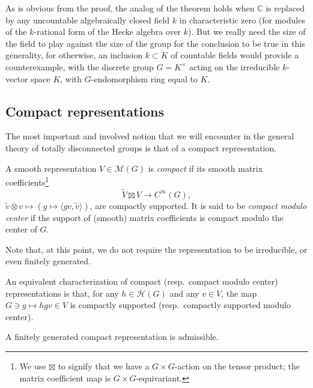 \begin{remark}
 \label{remark-proof-uncountable}
As is obvious from the proof, the analog of the theorem holds when $\mathbb C$ is replaced by any uncountable algebraically closed field $k$ in characteristic zero (for modules of the $k$-rational form of the Hecke algebra over $k$). But we really need the size of the field to play against the size of the group for the conclusion to be true in this generality, for otherwise, an inclusion $k\subset K$ of countable fields would provide a counterexample, with the discrete group $G=K^\times$ acting on the irreducible $k$-vector space $K$, with $G$-endomorphism ring equal to $K$. 
\end{remark}

\subsection{Compact representations}
\label{subsection-compact-representations}

The most important and involved notion that we will encounter in the general theory of totally disconnected groups is that of a compact representation.

\begin{definition}
	\label{definition-compact-representation}
A smooth representation $V\in \mathcal M(G)$ is {\it compact} if its smooth matrix coefficients\footnote{We use $\boxtimes$ to signify that we have a $G\times G$-action on the tensor product; the matrix coefficient map is $G\times G$-equivariant.}
\begin{equation}
	\label{equation-matrix-coefficient}
\tilde V\boxtimes V\to C^\infty(G),
\end{equation}
$\tilde v\otimes v \mapsto (g\mapsto \langle gv, \tilde v\rangle)$, are compactly supported. It is said to be {\it compact modulo center} if the support of (smooth) matrix coefficients is compact modulo the center of $G$.
\end{definition}

Note that, at this point, we do not require the representation to be irreducible, or even finitely generated.

\begin{proposition}
	\label{proposition-compact-admissible}
	An equivalent characterization of compact (resp.\ compact modulo center) representations is that, for any $h\in \mathcal H(G)$ and any $v\in V$, the map $G\ni g\mapsto hgv\in V$ is compactly supported (resp.\ compactly supported modulo center). 
	
	A finitely generated compact representation is admissible.
\end{proposition}

